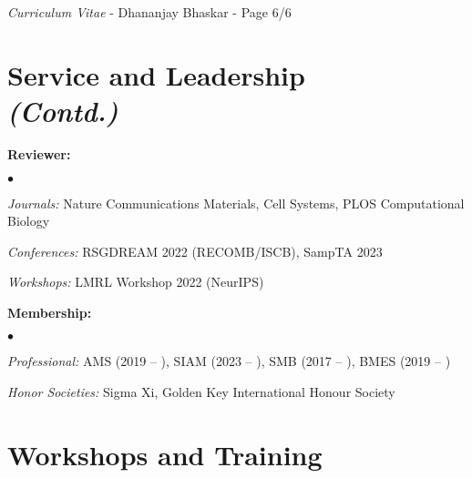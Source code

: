 \documentclass[margin,line]{res}
\newenvironment{list1}{
  \begin{list}{\ding{113}}{
      \setlength{\itemsep}{0in}
      \setlength{\parsep}{0in} \setlength{\parskip}{0in}
      \setlength{\topsep}{0in} \setlength{\partopsep}{0in}
      \setlength{\leftmargin}{0.17in}}}{\end{list}}
\newenvironment{list2}{
  \begin{list}{$\bullet$}{
      \setlength{\itemsep}{0in}
      \setlength{\parsep}{0in} \setlength{\parskip}{0in}
      \setlength{\topsep}{0in} \setlength{\partopsep}{0in}
      \setlength{\leftmargin}{0.2in}}}{\end{list}}
\begin{document}
\begin{resume}
\begin{list1}
\newpage
\begin{flushright}
\textit{Curriculum Vitae} - Dhananjay Bhaskar - Page 6/6
\end{flushright}
\vspace*{.02cm}

\section{\sc Service and Leadership\\ \textit{(Contd.)}}

\item[] {\bf Reviewer:}
\vspace*{.2cm}
\begin{list2}
\item[] \textit{Journals:} Nature Communications Materials, Cell Systems, PLOS Computational Biology
\item[] \textit{Conferences:} RSGDREAM 2022 (RECOMB/ISCB), SampTA 2023
\item[] \textit{Workshops:} LMRL Workshop 2022 (NeurIPS)
\end{list2}

\item[] {\bf Membership:}
\vspace*{.2cm}
\begin{list2}
\item[] \textit{Professional:} AMS (2019 -- ), SIAM (2023 -- ), SMB (2017 -- ), BMES (2019 -- )
\item[] \textit{Honor Societies:} Sigma Xi, Golden Key International Honour Society
\end{list2}

\end{list1}


\section{\sc Workshops and Training}


\end{resume}
\end{document}
